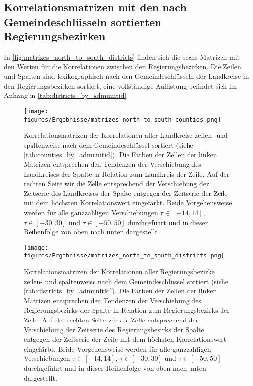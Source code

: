 \subsection{Korrelationsmatrizen mit den nach Gemeindeschlüsseln sortierten Regierungsbezirken}
In \autoref{fig:matrizes_north_to_south_districts} finden sich die sechs Matrizen mit den Werten für die Korrelationen zwischen den Regierungsbezirken. Die Zeilen und Spalten sind lexikographisch nach den Gemeindeschlüsseln der Landkreise in den Regierungsbezirken sortiert, eine vollständige Auflistung befindet sich im Anhang in \autoref{tab:districts_by_admunitid}
\begin{figure}[H]
    \centering
    \texttt{[image: figures/Ergebnisse/matrizes\_north\_to\_south\_counties.png]}
    \caption{Korrelationsmatrizen der Korrelationen aller Landkreise zeilen- und spaltenweise nach dem Gemeindeschlüssel sortiert (siehe \autoref{tab:counties_by_admunitid}). Die Farben der Zellen der linken Matrizen entsprechen den Tendenzen der Verschiebung des Landkreises der Spalte in Relation zum Landkreis der Zeile.
    Auf der rechten Seite wir die Zelle entsprechend der Verschiebung der Zeitserie des Landkreises der Spalte entgegen der Zeitserie der Zeile mit dem höchsten Korrelationswert eingefärbt. Beide Vorgehensweise werden für alle ganzzahligen Verschiebungen $\tau\in[-14,14]$,  $\tau\in[-30,30]$ und  $\tau\in[-50,50]$ durchgeführt und in dieser Reihenfolge von oben nach unten dargestellt.}
    \label{fig:matrizes_north_to_south_counties}
\end{figure}
\begin{figure}[H]
    \centering
    \texttt{[image: figures/Ergebnisse/matrizes\_north\_to\_south\_districts.png]}
    \caption{Korrelationsmatrizen der Korrelationen aller Regierungsbezirke zeilen- und spaltenweise nach dem Gemeindeschlüssel sortiert (siehe \autoref{tab:districts_by_admunitid}). Die Farben der Zellen der linken Matrizen entsprechen den Tendenzen der Verschiebung des Regierungsbezirks der Spalte in Relation zum Regierungsbezirks der Zeile.
    Auf der rechten Seite wir die Zelle entsprechend der Verschiebung der Zeitserie des Regierungsbezirks der Spalte entgegen der Zeitserie der Zeile mit dem höchsten Korrelationswert eingefärbt. Beide Vorgehensweise werden für alle ganzzahligen Verschiebungen $\tau\in[-14,14]$,  $\tau\in[-30,30]$ und  $\tau\in[-50,50]$ durchgeführt und in dieser Reihenfolge von oben nach unten dargestellt.}
    \label{fig:matrizes_north_to_south_districts}
\end{figure}
